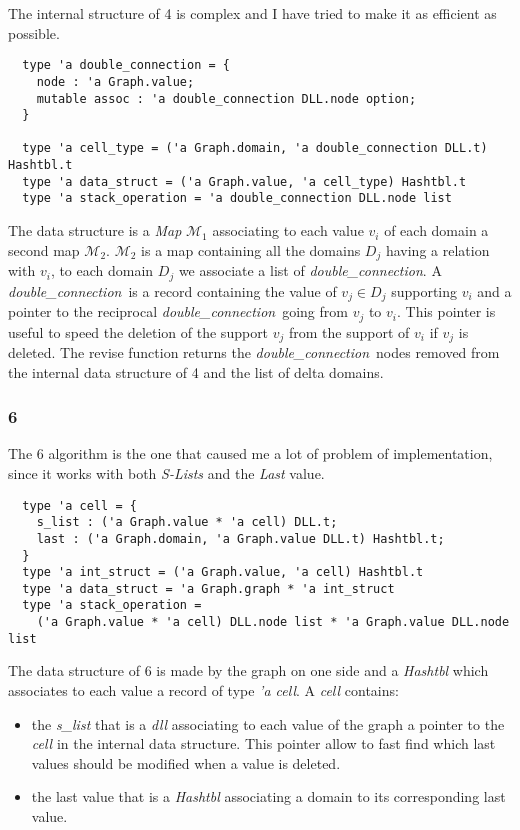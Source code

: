 \documentclass{rapport}
\begin{document}
The internal structure of \ac{4} is complex and I have tried to make it as efficient as possible.

\begin{verbatim}
  type 'a double_connection = {
    node : 'a Graph.value;
    mutable assoc : 'a double_connection DLL.node option;
  }

  type 'a cell_type = ('a Graph.domain, 'a double_connection DLL.t) Hashtbl.t
  type 'a data_struct = ('a Graph.value, 'a cell_type) Hashtbl.t
  type 'a stack_operation = 'a double_connection DLL.node list
\end{verbatim}

\def\dc{\textit{double\_connection}}
\def\ds{\textit{data\_struct}}

The data structure is a \textit{Map} $\mathcal{M}_1$ associating to each value $v_i$ of each domain a second map $\mathcal{M_2}$. $\mathcal{M}_2$ is a map containing all the domains $D_j$ having a relation with $v_i$, to each domain $D_j$ we associate a list of \dc. A \dc\ is a record containing the value of $v_j \in D_j$ supporting $v_i$ and a pointer to the reciprocal \dc\ going from $v_j$ to $v_i$. This pointer is useful to speed the deletion of the support $v_j$ from the support of $v_i$ if $v_j$ is deleted. The revise function returns the \dc\ nodes removed from the internal data structure of \ac{4} and the list of delta domains.

\subsubsection{\ac{6}}

The \ac{6} algorithm is the one that caused me a lot of problem of implementation, since it works with both \textit{S-Lists} and the \textit{Last} value.

\begin{verbatim}
  type 'a cell = {
    s_list : ('a Graph.value * 'a cell) DLL.t;
    last : ('a Graph.domain, 'a Graph.value DLL.t) Hashtbl.t;
  }
  type 'a int_struct = ('a Graph.value, 'a cell) Hashtbl.t
  type 'a data_struct = 'a Graph.graph * 'a int_struct
  type 'a stack_operation =
    ('a Graph.value * 'a cell) DLL.node list * 'a Graph.value DLL.node list
\end{verbatim}

The data structure of \ac{6} is made by the graph on one side and a \textit{Hashtbl} which associates to each value a record of type \textit{'a cell}. A \textit{cell} contains:
\begin{itemize}
  \item the \textit{s\_list} that is a \textit{dll} associating to each value of the graph a pointer to the \textit{cell} in the internal data structure. This pointer allow to fast find which last values should be modified when a value is deleted.
  \item the last value that is a \textit{Hashtbl} associating a domain to its corresponding last value.
\end{itemize}
\end{document}
